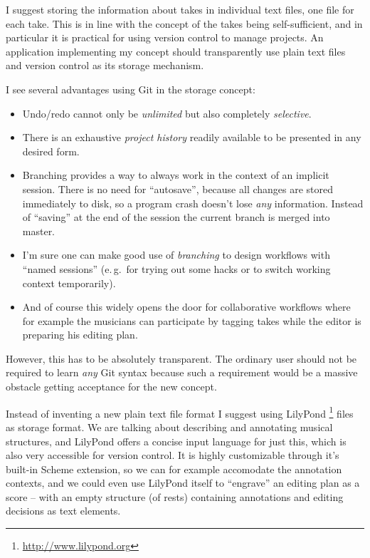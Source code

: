 \documentclass[11pt,a4paper]{article}
\begin{document}
I suggest storing the information about takes in individual text files, one file for each take.
This is in line with the concept of the takes being self-sufficient, and in particular it is practical for using version control to manage projects.
An application implementing my concept should transparently use plain text files and version control as its storage mechanism.

I see several advantages using Git in the storage concept:
\begin{itemize}
\item Undo/redo cannot only be \emph{unlimited} but also completely \emph{selective}.
\item There is an exhaustive \emph{project history} readily available to be presented in any desired form. 
\item Branching provides a way to always work in the context of an implicit session.
There is no need for “autosave”, because all changes are stored immediately to disk, so a program crash doesn't lose \emph{any} information.
Instead of “saving” at the end of the session the current branch is merged into master.
\item I'm sure one can make good use of \emph{branching} to design workflows with “named sessions” (e.\,g.\ for trying out some hacks or to switch working context temporarily).
\item And of course this widely opens the door for collaborative workflows where for example the musicians can participate by tagging takes while the editor is preparing his editing plan.
\end{itemize}

However, this has to be absolutely transparent.
The ordinary user should not be required to learn \emph{any} Git syntax because such a requirement would be a massive obstacle getting acceptance for the new concept.

\medskip
Instead of inventing a new plain text file format I suggest using LilyPond%
\footnote{\url{http://www.lilypond.org}}
files as storage format.
We are talking about describing and annotating musical structures, and LilyPond offers a concise input language for just this, which is also very accessible for version control.
It is highly customizable through it's built-in Scheme extension, so we can for example accomodate the annotation contexts, and we could even use LilyPond itself to “engrave” an editing plan as a score -- with an empty structure (of rests) containing annotations and editing decisions as text elements.
\end{document}

